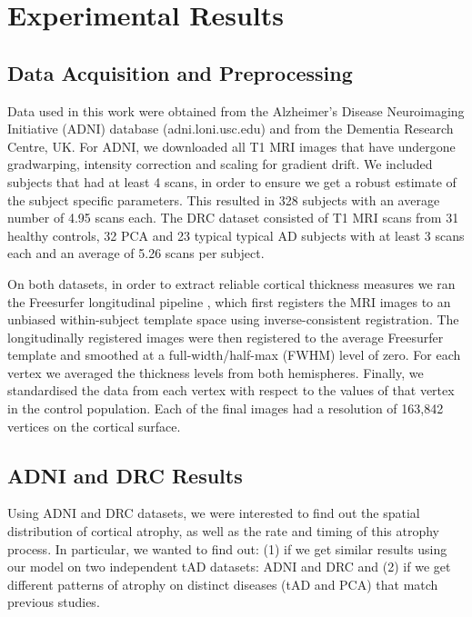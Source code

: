\documentclass{llncs}
\begin{document}
\section{Experimental Results}

\subsection{Data Acquisition and Preprocessing}

Data used in this work were obtained from the Alzheimer's Disease Neuroimaging Initiative (ADNI) database (adni.loni.usc.edu) and from the Dementia Research Centre, UK. For ADNI, we downloaded all T1 MRI images that have undergone gradwarping, intensity correction and scaling for gradient drift. We included subjects that had at least 4 scans, in order to ensure we get a robust estimate of the subject specific parameters. This resulted in 328 subjects with an average number of 4.95 scans each. The DRC dataset consisted of T1 MRI scans from 31 healthy controls, 32 PCA and 23 typical typical AD subjects with at least 3 scans each and an average of 5.26 scans per subject.

On both datasets, in order to extract reliable cortical thickness measures we ran the Freesurfer longitudinal pipeline \cite{reuter2012longitudinal}, which first registers the MRI images to an unbiased within-subject template space using inverse-consistent registration. The longitudinally registered images were then registered to the average Freesurfer template and smoothed at a full-width/half-max (FWHM) level of zero. For each vertex we averaged the thickness levels from both hemispheres. Finally, we standardised the data from each vertex with respect to the values of that vertex in the control population.  Each of the final images had a resolution of 163,842 vertices on the cortical surface. 


\subsection{ADNI and DRC Results}

Using ADNI and DRC datasets, we were interested to find out the spatial distribution of cortical atrophy, as well as the rate and timing of this atrophy process. In particular, we wanted to find out: (1) if we get similar results using our model on two independent tAD datasets: ADNI and DRC and (2) if we get different patterns of atrophy on distinct diseases (tAD and PCA) that match previous studies. 
\end{document}
